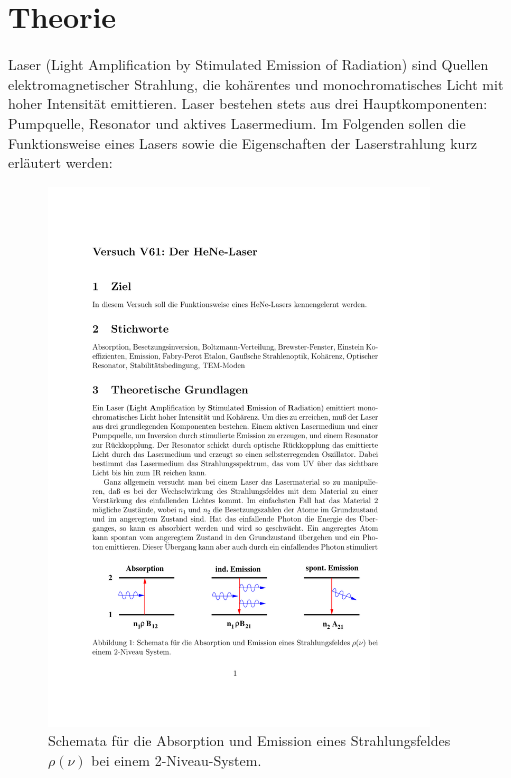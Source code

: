\section{Theorie}
\label{sec:theorie}

Laser (Light Amplification by Stimulated Emission of Radiation) sind Quellen
elektromagnetischer Strahlung, die kohärentes und monochromatisches Licht mit
hoher Intensität emittieren. Laser bestehen stets aus drei Hauptkomponenten:
Pumpquelle, Resonator und aktives Lasermedium. Im Folgenden sollen die
Funktionsweise eines Lasers sowie die Eigenschaften der Laserstrahlung kurz
erläutert werden:

\begin{figure}[htb]
  \centering
  \includegraphics[width=0.9\textwidth]{figures/fig_Übergänge.pdf}
  \caption{Schemata für die Absorption und Emission eines
  Strahlungsfeldes~$\rho(\nu)$ bei einem \num{2}-Niveau-System.}
  \label{fig:Übergänge}
\end{figure}

